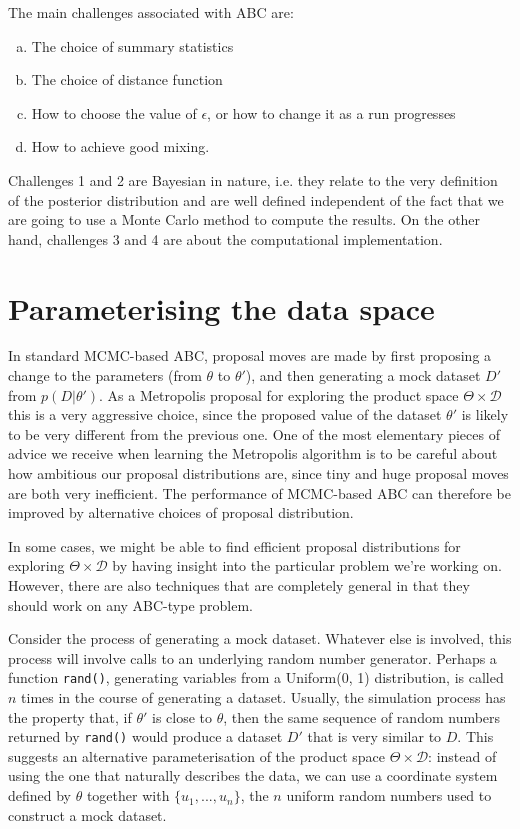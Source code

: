 \documentclass[article]{jss}
\newcommand{\params}{\theta}
\newcommand{\data}{D}
\begin{document}
The main challenges associated with ABC are:
\begin{enumerate}[(a)]
\item The choice of summary statistics
\item The choice of distance function
\item How to choose the value of $\epsilon$, or how to change it as a run
progresses
\item How to achieve good mixing.
\end{enumerate}
Challenges 1 and 2 are Bayesian in nature, i.e. they relate to the very
definition of the posterior distribution and are well defined independent of
the fact that we are going to use a Monte Carlo method to compute the
results. On the other hand, challenges 3 and 4 are about the computational implementation.

\section{Parameterising the data space}
In standard MCMC-based ABC, proposal moves are made by first proposing a
change to the parameters (from $\params$ to $\params'$), and then generating
a mock dataset $\data'$ from $p(\data | \params')$. As a Metropolis proposal
for exploring the product space $\Theta \times \mathcal{D}$ this is a very
aggressive choice, since the proposed value of the
dataset $\params'$ is likely to be very different from the previous one.
One of the most elementary pieces of advice we receive when learning the
Metropolis algorithm is to be careful about how ambitious our proposal
distributions are, since tiny and huge proposal moves are both very
inefficient. The performance of MCMC-based ABC can therefore be improved by
alternative choices of proposal distribution.

In some cases, we might be able to find efficient proposal distributions for exploring $\Theta \times \mathcal{D}$ by having insight into the particular
problem we're working on. However, there are also techniques that are
completely general in that they should work on any ABC-type problem.

Consider the process of generating a mock dataset. Whatever else is involved,
this process will involve calls to an underlying random number generator.
Perhaps a function {\tt rand()}, generating variables from a Uniform(0, 1)
distribution, is called $n$ times in the course of generating a dataset.
Usually, the simulation process has the property that, if $\theta'$ is
close to $\theta$, then the same sequence of random numbers returned by
{\tt rand()} would produce a dataset $\data'$ that is very similar to $\data$.
This suggests an alternative parameterisation of
the product space $\Theta\times\mathcal{D}$: instead of using the one that
naturally describes the data, we can use a coordinate system defined by
$\theta$ together with $\{u_1, ..., u_n\}$, the $n$ uniform random numbers
used to construct a mock dataset.
\end{document}
